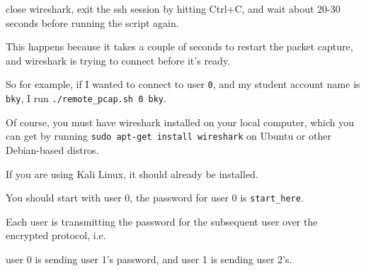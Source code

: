 {                    close wireshark, exit the ssh session by hitting Ctrl+C, and wait about 20-30 seconds before running the script again.







                    This happens because it takes a couple of seconds to restart the packet capture, and wireshark is trying to connect before it's ready.















                    So for example, if I wanted to connect to user \lstinline`0`, and my student account name is \lstinline`bky`, I run \lstinline`./remote_pcap.sh 0 bky`. 







                    Of course, you must have wireshark installed on your local computer, which you can get by running \lstinline`sudo apt-get install wireshark` on Ubuntu or other Debian-based distros.







                    If you are using Kali Linux, it should already be installed.















                    You should start with user 0, the password for user 0 is \lstinline`start_here`. %







Each user is transmitting the password for the subsequent user over the encrypted protocol, i.e. %







user 0 is sending user 1's password, and user 1 is sending user 2's. %







}
